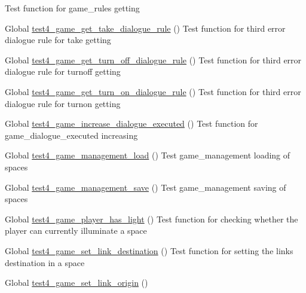 \begin{DoxyRefList}
%
Test function for game\+\_\+rules getting  
\item[Global \mbox{\hyperlink{game__test_8c_ac45ad2258685117ec4a90557f0c51dad}{test4\+\_\+game\+\_\+get\+\_\+take\+\_\+dialogue\+\_\+rule}} ()]\label{test__test000338}%
%
Test function for third error dialogue rule for take getting  
\item[Global \mbox{\hyperlink{game__test_8c_a86601fd2a648cdcbd45f6a26b26ca19e}{test4\+\_\+game\+\_\+get\+\_\+turn\+\_\+off\+\_\+dialogue\+\_\+rule}} ()]\label{test__test000364}%
%
Test function for third error dialogue rule for turnoff getting  
\item[Global \mbox{\hyperlink{game__test_8c_af825306aa5709855148e9cda4681ea40}{test4\+\_\+game\+\_\+get\+\_\+turn\+\_\+on\+\_\+dialogue\+\_\+rule}} ()]\label{test__test000358}%
%
Test function for third error dialogue rule for turnon getting  
\item[Global \mbox{\hyperlink{game__test_8c_a2052da90924ee8fd9e2e946e3b3baef9}{test4\+\_\+game\+\_\+increase\+\_\+dialogue\+\_\+executed}} ()]\label{test__test000306}%
%
Test function for game\+\_\+dialogue\+\_\+executed increasing  
\item[Global \mbox{\hyperlink{game__management__test_8c_a4b61a2907a598a85e9aca4aedd671abe}{test4\+\_\+game\+\_\+management\+\_\+load}} ()]\label{test__test000112}%
%
Test game\+\_\+management loading of spaces  
\item[Global \mbox{\hyperlink{game__management__test_8c_aaecdb78856625f8a108e2f08dc3f4bbc}{test4\+\_\+game\+\_\+management\+\_\+save}} ()]\label{test__test000126}%
%
Test game\+\_\+management saving of spaces  
\item[Global \mbox{\hyperlink{game__test_8c_ae72f8f7ac61a0475aed4c8b1f0dd0155}{test4\+\_\+game\+\_\+player\+\_\+has\+\_\+light}} ()]\label{test__test000173}%
%
Test function for checking whether the player can currently illuminate a space  
\item[Global \mbox{\hyperlink{game__test_8c_a705aa6e386e9f71eca19899f4aadc087}{test4\+\_\+game\+\_\+set\+\_\+link\+\_\+destination}} ()]\label{test__test000252}%
%
Test function for setting the link\textquotesingle{}s destination in a space  
\item[Global \mbox{\hyperlink{game__test_8c_af36497bcf88e96346045da6917e703d5}{test4\+\_\+game\+\_\+set\+\_\+link\+\_\+origin}} ()]\label{test__test000246}%

\end{DoxyRefList}
